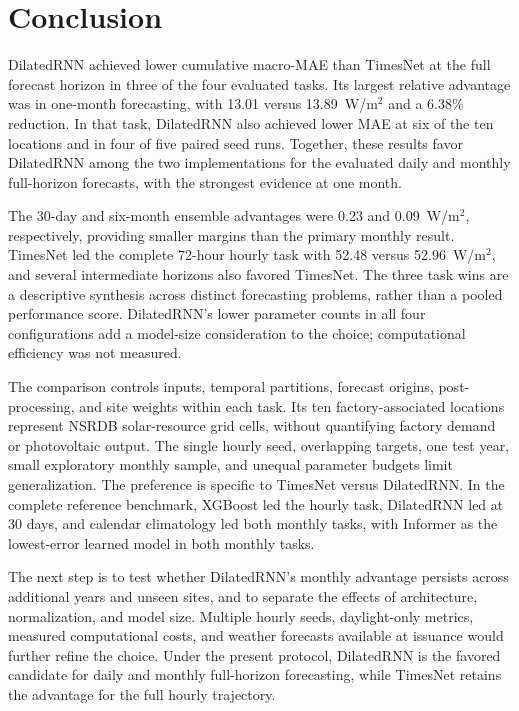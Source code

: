 \section{Conclusion}
\label{sec:conclusion}

DilatedRNN achieved lower cumulative macro-MAE than TimesNet at the full
forecast horizon in three of the four evaluated tasks. Its largest
relative advantage was in one-month forecasting, with
13.01 versus 13.89~W/m$^2$ and a 6.38\% reduction. In that task,
DilatedRNN also achieved lower MAE at six of the ten locations and in
four of five paired seed runs. Together, these results favor DilatedRNN
among the two implementations for the evaluated daily and monthly
full-horizon forecasts, with the strongest evidence at one month.

The 30-day and six-month ensemble advantages were
0.23 and 0.09~W/m$^2$, respectively, providing smaller margins than the
primary monthly result. TimesNet led the complete 72-hour hourly task
with 52.48 versus 52.96~W/m$^2$, and several intermediate horizons
also favored TimesNet. The three task wins are a descriptive synthesis
across distinct forecasting problems, rather than a pooled performance
score. DilatedRNN's lower parameter counts in all four configurations
add a model-size consideration to the choice; computational efficiency
was not measured.

The comparison controls inputs, temporal partitions, forecast origins,
post-processing, and site weights within each task. Its ten
factory-associated locations represent NSRDB solar-resource grid cells,
without quantifying factory demand or photovoltaic output. The
single hourly seed, overlapping targets, one test year, small
exploratory monthly sample, and unequal parameter budgets limit
generalization. The preference is specific to TimesNet versus DilatedRNN.
In the complete reference benchmark, XGBoost led the hourly task,
DilatedRNN led at 30 days, and calendar climatology led both monthly tasks,
with Informer as the lowest-error learned model in both monthly tasks.

The next step is to test whether DilatedRNN's monthly advantage persists
across additional years and unseen sites, and to separate the effects of
architecture, normalization, and model size. Multiple hourly seeds,
daylight-only metrics, measured computational costs, and weather forecasts
available at issuance would further refine the choice.
Under the present protocol, DilatedRNN is the favored candidate for
daily and monthly full-horizon forecasting, while TimesNet retains the
advantage for the full hourly trajectory.
